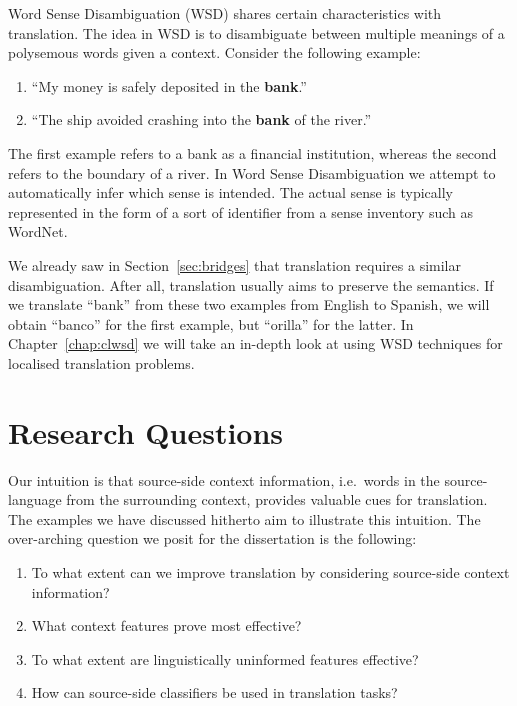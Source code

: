 Word Sense Disambiguation (WSD) shares certain characteristics with
translation. The idea in WSD is to disambiguate between multiple meanings of a
polysemous words given a context. Consider the following example:

\begin{enumerate}
\item ``My money is safely deposited in the \textbf{bank}.''
\item ``The ship avoided crashing into the \textbf{bank} of the river.''
\end{enumerate}

The first example refers to a bank as a financial institution, whereas the
second refers to the boundary of a river. In Word Sense Disambiguation we
attempt to automatically infer which sense is intended. The actual sense is
typically represented in the form of a sort of identifier from a sense inventory
such as WordNet.

We already saw in Section~\ref{sec:bridges} that translation requires a
similar disambiguation. After all, translation usually aims to preserve the
semantics. If we translate ``bank'' from these two examples from English to
Spanish, we will obtain ``banco'' for the first example, but ``orilla'' for the
latter. In Chapter~\ref{chap:clwsd} we will take an in-depth look at using
WSD techniques for localised translation problems.

\section{Research Questions}
\label{sec:overallresearchquestion}

Our intuition is that source-side context information, i.e.\ words in the
source-language from the surrounding context, provides valuable cues for
translation. The examples we have discussed hitherto aim to illustrate this
intuition. The over-arching
question we posit for the dissertation is the following:

\begin{enumerate}
\item To what extent can we improve translation by considering source-side
    context information?
\item What context features prove most effective?
\item To what extent are linguistically uninformed features effective?
\item How can source-side classifiers be used in translation tasks?
\end{enumerate}

